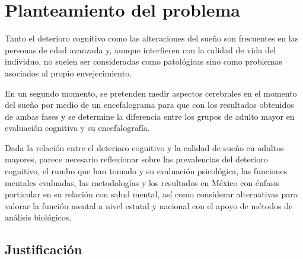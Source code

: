 \chapter{Planteamiento del problema}


Tanto el deterioro cognitivo como las alteraciones del sueño son frecuentes en las personas de 
edad avanzada y, aunque interfieren con la calidad de vida del individuo, no suelen ser 
consideradas como patológicas sino como problemas asociados al propio envejecimiento.

En un segundo momento, se pretenden medir aspectos cerebrales en el momento del sueño por medio 
de un encefalograma para que con los resultados obtenidos de ambas fases y se determine la 
diferencia entre los grupos de adulto mayor en evaluación cognitiva y su encefalografía.

Dada la relación entre el deterioro cognitivo y la calidad de sueño en adultos mayores, parece necesario reflexionar sobre las prevalencias del deterioro cognitivo, el rumbo que han tomado y su evaluación psicológica, las funciones mentales evaluadas, las metodologías y los resultados en México con énfasis particular en su relación con salud mental, así como considerar alternativas para valorar la función mental a nivel estatal y nacional con el apoyo de métodos de análisis biológicos. 




\section{Justificaci\'on}


